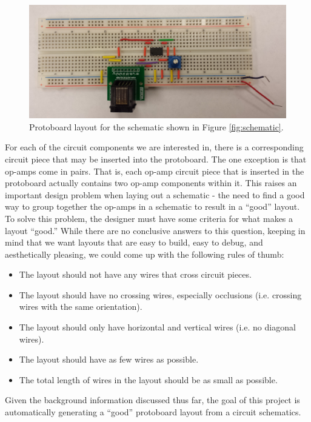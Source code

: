 \begin{figure}
\begin{center}
\includegraphics[width=\textwidth]{Images/sample_physical_layout.jpg}
\caption[Sample protoboard layout]{Protoboard layout for the schematic shown in
Figure \ref{fig:schematic}.}
\label{fig:eg_s_to_pb}
\end{center}
\end{figure}

For each of the circuit components we are interested in, there is a corresponding
circuit piece that may be inserted into the protoboard. The one exception is that
op-amps come in pairs. That is, each op-amp circuit piece that is inserted in the
protoboard actually contains two op-amp components within it. This raises an
important design problem when laying out a schematic - the need to find a
good way to group together the op-amps in a schematic to result in a ``good''
layout. To solve this problem, the designer must have some criteria for what
makes a layout ``good.'' While there are no conclusive answers to this
question, keeping in mind that we want layouts that are easy to build,
easy to debug, and aesthetically pleasing, we could come up with the
following rules of thumb:
\begin{itemize}
\item The layout should not have any wires that cross circuit pieces.
\item The layout should have no crossing wires, especially occlusions (i.e.
crossing wires with the same orientation).
\item The layout should only have horizontal and vertical wires (i.e. no
diagonal wires).
\item The layout should have as few wires as possible.
\item The total length of wires in the layout should be as small as possible.
\end{itemize}

Given the background information discussed thus far, the goal of this project is
automatically generating a ``good'' protoboard layout from a circuit schematics.

